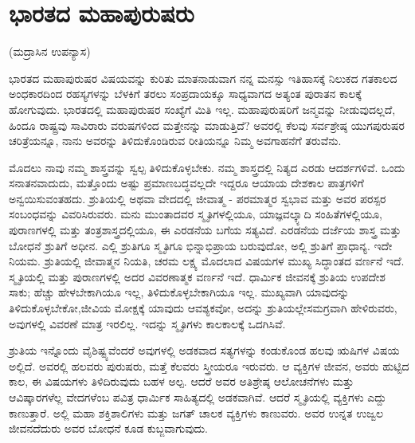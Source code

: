 
\chapter{ಭಾರತದ ಮಹಾಪುರುಷರು}

\begin{center}
(ಮದ್ರಾಸಿನ ಉಪನ್ಯಾಸ)
\end{center}

ಭಾರತದ ಮಹಾಪುರುಷರ ವಿಷಯವನ್ನು ಕುರಿತು ಮಾತನಾಡುವಾಗ ನನ್ನ ಮನಸ್ಸು ಇತಿಹಾಸಕ್ಕೆ ನಿಲುಕದ ಗತಕಾಲದ ಅಂಧಕಾರದಿಂದ ರಹಸ್ಯಗಳನ್ನು ಬೆಳಕಿಗೆ ತರಲು ಸಂಪ್ರದಾಯಕ್ಕೂ ಸಾಧ್ಯವಾಗದ ಅತ್ಯಂತ ಪುರಾತನ ಕಾಲಕ್ಕೆ ಹೋಗುವುದು. ಭಾರತದಲ್ಲಿ ಮಹಾಪುರುಷರ ಸಂಖ್ಯೆಗೆ ಮಿತಿ ಇಲ್ಲ. ಮಹಾಪುರುಷರಿಗೆ ಜನ್ಮವನ್ನು ನೀಡುವುದಲ್ಲದೆ, ಹಿಂದೂ ರಾಷ್ಟ್ರವು ಸಾವಿರಾರು ವರುಷ\-ಗಳಿಂದ ಮತ್ತೇನನ್ನು ಮಾಡುತ್ತಿದೆ? ಅವರಲ್ಲಿ ಕೆಲವು ಸರ್ವಶ್ರೇಷ್ಠ ಯುಗಪುರುಷರ ಚರಿತ್ರೆಯನ್ನೂ, ನಾನು ಅವರನ್ನು ತಿಳಿದುಕೊಂಡಿರುವ ರೀತಿಯನ್ನೂ ನಿಮ್ಮ ಅವಗಾಹನೆಗೆ ತರುವೆನು.

\vskip 2pt

ಮೊದಲು ನಾವು ನಮ್ಮ ಶಾಸ್ತ್ರವನ್ನು ಸ್ವಲ್ಪ ತಿಳಿದುಕೊಳ್ಳಬೇಕು. ನಮ್ಮ ಶಾಸ್ತ್ರದಲ್ಲಿ ನಿತ್ಯದ ಎರಡು ಆದರ್ಶಗಳಿವೆ. ಒಂದು ಸನಾತನವಾದುದು, ಮತ್ತೊಂದು ಅಷ್ಟು ಪ್ರಮಾಣಬದ್ಧವಲ್ಲದೇ ಇದ್ದರೂ ಆಯಾಯ ದೇಶಕಾಲ ಪಾತ್ರಗಳಿಗೆ ಅನ್ವಯಿಸುವಂತಹದು. ಶ್ರುತಿಯಲ್ಲಿ ಅಥವಾ ವೇದದಲ್ಲಿ ಜೀವಾತ್ಮ - ಪರಮಾತ್ಮರ ಸ್ವಭಾವ ಮತ್ತು ಅವರ ಪರಸ್ಪರ ಸಂಬಂಧವನ್ನು ವಿವರಿಸಿರುವರು. ಮನು ಮುಂತಾದವರ ಸ್ಮೃತಿಗಳಲ್ಲಿಯೂ, ಯಾಜ್ಞವಲ್ಕ್ಯಾದಿ ಸಂಹಿತೆಗಳಲ್ಲಿಯೂ, ಪುರಾಣಗಳಲ್ಲಿ ಮತ್ತು ತಂತ್ರಶಾಸ್ತ್ರದಲ್ಲಿಯೂ, ಈ ಎರಡನೆಯ ಬಗೆಯ ಸತ್ಯವಿದೆ. ಎರಡನೆಯ ದರ್ಜೆಯ ಶಾಸ್ತ್ರ ಮತ್ತು ಬೋಧನೆ ಶ್ರುತಿಗೆ ಅಧೀನ. ಎಲ್ಲಿ ಶ್ರುತಿಗೂ ಸ್ಮೃತಿಗೂ ಭಿನ್ನಾಭಿಪ್ರಾಯ ಬರುವುದೋ, ಅಲ್ಲಿ ಶ್ರುತಿಗೆ ಪ್ರಾಧಾನ್ಯ. ಇದೇ ನಿಯಮ. ಶ್ರುತಿಯಲ್ಲಿ ಜೀವಾತ್ಮನ ನಿಯತಿ, ಚರಮ ಲಕ್ಷ್ಯ ಮೊದಲಾದ ವಿಷಯಗಳ ಮುಖ್ಯ ಸಿದ್ಧಾಂತದ ವರ್ಣನೆ ಇದೆ. ಸ್ಮೃತಿಯಲ್ಲಿ ಮತ್ತು ಪುರಾಣಗಳಲ್ಲಿ ಅದರ ವಿವರಣಾತ್ಮಕ ವರ್ಣನೆ ಇದೆ. ಧಾರ್ಮಿಕ ಜೀವನಕ್ಕೆ ಶ್ರುತಿಯ ಉಪದೇಶ ಸಾಕು; ಹೆಚ್ಚು ಹೇಳಬೇಕಾಗಿಯೂ ಇಲ್ಲ, ತಿಳಿದುಕೊಳ್ಳಬೇಕಾಗಿಯೂ ಇಲ್ಲ. ಮುಖ್ಯವಾಗಿ ಯಾವುದನ್ನು ತಿಳಿದುಕೊಳ್ಳಬೇಕೋ,\break ಜೀವಿಯ ಮೋಕ್ಷಕ್ಕೆ ಯಾವುದು ಆವಶ್ಯಕವೋ, ಅದನ್ನು ಶ್ರುತಿಯಲ್ಲೇ\break ಸಮಗ್ರವಾಗಿ ಹೇಳಿರುವರು, ಅವುಗಳಲ್ಲಿ ವಿವರಣೆ ಮಾತ್ರ ಇರಲಿಲ್ಲ. ಇದನ್ನು ಸ್ಮೃತಿಗಳು ಕಾಲಕಾಲಕ್ಕೆ ಒದಗಿಸಿವೆ.

ಶ್ರುತಿಯ ಇನ್ನೊಂದು ವೈಶಿಷ್ಟ್ಯವೆಂದರೆ ಅವುಗಳಲ್ಲಿ ಅಡಕವಾದ ಸತ್ಯಗಳನ್ನು ಕಂಡುಕೊಂಡ ಹಲವು ಋಷಿಗಳ ವಿಷಯ ಅಲ್ಲಿದೆ. ಅವರಲ್ಲಿ ಹಲವರು ಪುರುಷರು, ಮತ್ತೆ ಕೆಲವರು ಸ್ತ್ರೀಯರೂ ಇರುವರು. ಆ ವ್ಯಕ್ತಿಗಳ ಜೀವನ, ಅವರು ಹುಟ್ಟಿದ ಕಾಲ, ಈ ವಿಷಯಗಳು ತಿಳಿದಿರುವುದು ಬಹಳ ಅಲ್ಪ. ಆದರೆ ಅವರ ಅತಿಶ್ರೇಷ್ಠ ಆಲೋಚನೆಗಳು ಮತ್ತು ಆವಿಷ್ಕಾರಗಳೆಲ್ಲ ವೇದಗಳೆಂಬ ಪವಿತ್ರ ಧಾರ್ಮಿಕ ಸಾಹಿತ್ಯದಲ್ಲಿ ಅಡಕವಾಗಿವೆ. ಆದರೆ ಸ್ಮೃತಿಯಲ್ಲಿ ವ್ಯಕ್ತಿಗಳು ಎದ್ದು ಕಾಣುತ್ತಾರೆ. ಅಲ್ಲಿ ಮಹಾ ಶಕ್ತಿಶಾಲಿಗಳು ಮತ್ತು ಜಗತ್​ ಚಾಲಕ ವ್ಯಕ್ತಿಗಳು ಕಾಣುವರು. ಅವರ ಉನ್ನತ ಉಜ್ವಲ ಜೀವನದೆದುರು ಅವರ ಬೋಧನೆ ಕೂಡ ಕುಬ್ಜವಾಗುವುದು.


